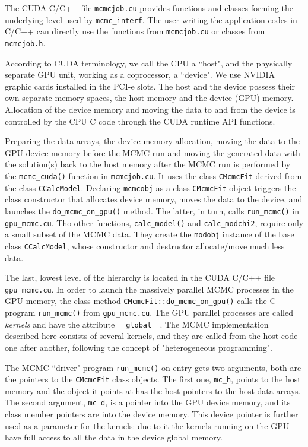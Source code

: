 \documentclass[preprint2]{aastex}
\begin{document}
The CUDA C/C++ file \verb|mcmcjob.cu| provides functions and classes forming the underlying level used by \verb|mcmc_interf|. The user writing the application codes in C/C++ can directly use the functions from \verb|mcmcjob.cu| or classes from \verb|mcmcjob.h|.    

According to CUDA terminology, we call the CPU a ``host", and the physically separate GPU unit,
working as a coprocessor, a ``device". We use NVIDIA graphic cards installed in
the PCI-e slots. The host and the device possess their own separate memory spaces, the host 
memory and the device (GPU) memory. Allocation of the device memory and moving the data to and from the device is controlled by the CPU C code through the CUDA runtime API functions.  

Preparing the data arrays, the device memory allocation, moving the data to the GPU device memory before 
the MCMC run and moving the generated data with the solution(s) back to the host memory after the MCMC run
is performed by the \verb|mcmc_cuda()| function in \verb|mcmcjob.cu|. It uses the class \verb|CMcmcFit| derived from the class \verb|CCalcModel|. Declaring \verb|mcmcobj| as a class \verb|CMcmcFit| object triggers the class constructor that allocates device memory, moves the data to the device, and launches the \verb|do_mcmc_on_gpu()| method. The latter, in turn, calls \verb|run_mcmc()| in \verb|gpu_mcmc.cu|. Tho other functions, \verb|calc_model()| and \verb|calc_modchi2|, require only a small subset of the MCMC data. They create the \verb|modobj| instance of the base class \verb|CCalcModel|, whose constructor and destructor allocate/move much less data. 

The last, lowest level of the hierarchy is located in the CUDA C/C++ file \verb|gpu_mcmc.cu|. In order to launch the massively parallel MCMC processes in the GPU memory, the class method \verb|CMcmcFit::do_mcmc_on_gpu()| calls the C program \verb|run_mcmc()| from \verb|gpu_mcmc.cu|. The GPU parallel processes are called \emph{kernels} and have the attribute \verb|__global__|. The MCMC implementation described here consists of several kernels, and they are called from the host code one after another, following the concept of "heterogeneous programming". 

The MCMC ``driver" program \verb|run_mcmc()| on entry gets two arguments, both are the pointers to the \verb|CMcmcFit| class objects. The first one, \verb|mc_h|, points to the host memory and the object it points at has the host pointers to the host data arrays. The second argument, \verb|mc_d|, is a pointer into the GPU device memory, and its class member pointers are into the device memory. This device pointer is further used as a parameter for the kernels: due to it the kernels running on the GPU have full access to all the data in the device global memory.
\end{document}
